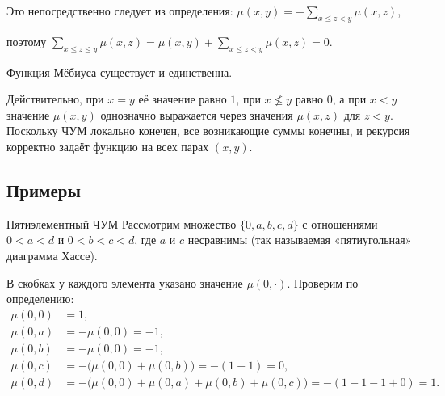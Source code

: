 Это непосредственно следует из определения: $\mu(x,y) = -\!\sum_{x \leq z < y}\mu(x,z)$,

поэтому $\sum_{x \leq z \leq y}\mu(x,z) = \mu(x,y) + \sum_{x \leq z < y}\mu(x,z) = 0$.

\begin{Remark}{}{}
	Функция Мёбиуса существует и единственна.
	
	Действительно, при $x=y$ её значение равно $1$, при $x \nleq y$ равно $0$,
	а при $x<y$ значение $\mu(x,y)$ однозначно выражается через значения
	$\mu(x,z)$ для $z<y$. Поскольку ЧУМ локально конечен, все возникающие суммы конечны, и рекурсия корректно задаёт функцию на всех парах $(x,y)$.
\end{Remark}
\subsection{Примеры}

\begin{Example}{Пятиэлементный ЧУМ}{}
	Рассмотрим множество $\{0, a, b, c, d\}$ с отношениями
	$0 < a < d$ и $0 < b < c < d$, где $a$ и $c$ несравнимы
	(так называемая «пятиугольная» диаграмма Хассе).
	
	\begin{center}
	\end{center}
	
	В скобках у каждого элемента указано значение $\mu(0,\cdot)$.
	Проверим по определению:
	\begin{align*}
		\mu(0,0) &= 1,\\
		\mu(0,a) &= -\mu(0,0) = -1,\\
		\mu(0,b) &= -\mu(0,0) = -1,\\
		\mu(0,c) &= -\bigl(\mu(0,0)+\mu(0,b)\bigr) = -(1 - 1) = 0,\\
		\mu(0,d) &= -\bigl(\mu(0,0)+\mu(0,a)+\mu(0,b)+\mu(0,c)\bigr)
		= -(1 - 1 - 1 + 0) = 1.
	\end{align*}
\end{Example}

